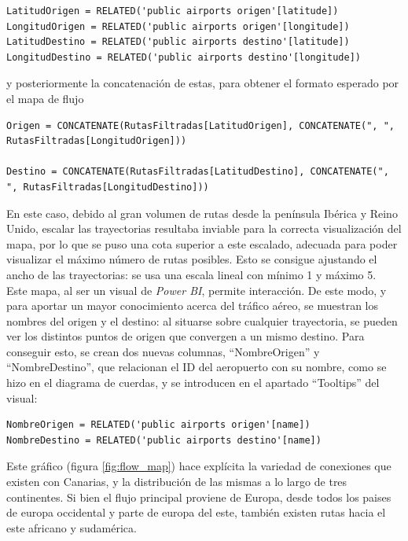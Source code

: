 \documentclass[11pt]{opticajnl}
\begin{document}
\begin{lstlisting}[style=terminal]
LatitudOrigen = RELATED('public airports origen'[latitude])
LongitudOrigen = RELATED('public airports origen'[longitude])
LatitudDestino = RELATED('public airports destino'[latitude])
LongitudDestino = RELATED('public airports destino'[longitude])
\end{lstlisting}

\noindent y posteriormente la concatenación de estas, para obtener el formato esperado por el mapa de flujo

\begin{lstlisting}[style=terminal]
Origen = CONCATENATE(RutasFiltradas[LatitudOrigen], CONCATENATE(", ", RutasFiltradas[LongitudOrigen]))

Destino = CONCATENATE(RutasFiltradas[LatitudDestino], CONCATENATE(", ", RutasFiltradas[LongitudDestino]))
\end{lstlisting}

En este caso, debido al gran volumen de rutas desde la península Ibérica y Reino Unido, escalar las trayectorias resultaba inviable para la correcta visualización del mapa, por lo que se puso una cota superior a este escalado, adecuada para poder visualizar el máximo número de rutas posibles. Esto se consigue ajustando el ancho de las trayectorias: se usa una escala lineal con mínimo 1 y máximo 5. \\

Este mapa, al ser un visual de \textit{Power BI}, permite interacción. De este modo, y para aportar un mayor conocimiento acerca del tráfico aéreo, se muestran los nombres del origen y el destino: al situarse sobre cualquier trayectoria, se pueden ver los distintos puntos de origen que convergen a un mismo destino. Para conseguir esto, se crean dos nuevas columnas, ``NombreOrigen'' y ``NombreDestino'', que relacionan el ID del aeropuerto con su nombre, como se hizo en el diagrama de cuerdas, y se introducen en el apartado ``Tooltips'' del visual: 

\begin{lstlisting}[style=terminal]
NombreOrigen = RELATED('public airports origen'[name])
NombreDestino = RELATED('public airports destino'[name])
\end{lstlisting}

Este gráfico (figura \ref{fig:flow_map}) hace explícita la variedad de conexiones que existen con Canarias, y la distribución de las mismas a lo largo de tres continentes. Si bien el flujo principal proviene de Europa, desde todos los paises de europa occidental y parte de europa del este, también existen rutas hacia el este africano y sudamérica. 
\end{document}
